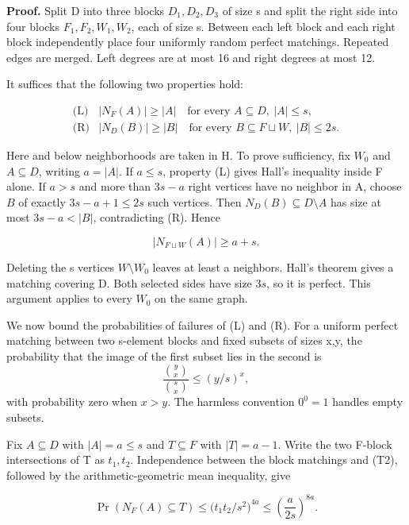 \documentclass[11pt,a4paper]{article}
\newcommand{\labelledparagraphstart}{\par\addvspace{3pt plus 1pt minus 1pt}\noindent}
\begin{document}
\labelledparagraphstart\textbf{Proof.} Split D into three blocks \(D_1,D_2,D_3\) of size s and split the right side into four blocks \(F_1,F_2,W_1,W_2\), each of size s. Between each left block and each right block independently place four uniformly random perfect matchings. Repeated edges are merged. Left degrees are at most 16 and right degrees at most 12.

It suffices that the following two properties hold:

\begin{equation}
\begin{array}{ll}
\text{(L)}& |N_F(A)|\ge |A|\quad\text{for every }A\subseteq D,\ |A|\le s,\\
\text{(R)}& |N_D(B)|\ge |B|\quad\text{for every }B\subseteq F\sqcup W,\ |B|\le2s.
\end{array}
\tag{T1}\label{eq:T1}
\end{equation}

Here and below neighborhoods are taken in H. To prove sufficiency, fix \(W_0\) and \(A\subseteq D\), writing \(a=|A|\). If \(a\le s\), property (L) gives Hall's inequality inside F alone. If \(a>s\) and more than \(3s-a\) right vertices have no neighbor in A, choose \(B\) of exactly \(3s-a+1\le 2s\) such vertices. Then \(N_D(B)\subseteq D\setminus A\) has size at most \(3s-a<|B|\), contradicting (R). Hence

\[
|N_{F\sqcup W}(A)|\ge a+s.
\]

Deleting the s vertices \(W\setminus W_0\) leaves at least a neighbors. Hall's theorem gives a matching covering D. Both selected sides have size \(3s\), so it is perfect. This argument applies to every \(W_0\) on the same graph.

We now bound the probabilities of failures of (L) and (R). For a uniform perfect matching between two s-element blocks and fixed subsets of sizes x,y, the probability that the image of the first subset lies in the second is \begin{equation}
\frac{\binom yx}{\binom sx}\le(y/s)^x,
\tag{T2}\label{eq:T2}
\end{equation} with probability zero when \(x>y\). The harmless convention \(0^{0}=1\) handles empty subsets.

Fix \(A\subseteq D\) with \(|A|=a\le s\) and \(T\subseteq F\) with \(|T|=a-1\). Write the two F-block intersections of T as \(t_1,t_2\). Independence between the block matchings and (T2), followed by the arithmetic-geometric mean inequality, give

\[
\Pr(N_F(A)\subseteq T)
\le \bigl(t_1t_2/s^2\bigr)^{4a}
\le \left(\frac{a}{2s}\right)^{8a}.
\]
\end{document}
